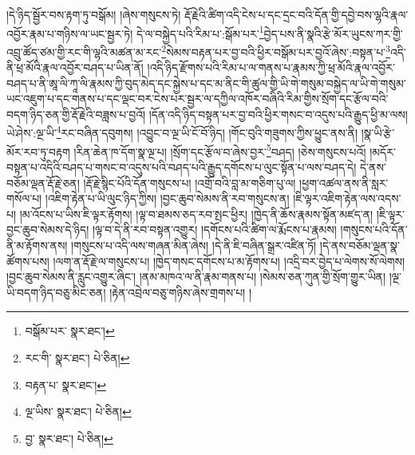 །དེ་ཉིད་སྦྱོར་བས་རྟག་ཏུ་བསྒོམ། །ཞེས་གསུངས་ཏེ། རྡོ་རྗེའི་ཚིག་འདི་ངེས་པ་དང་དྲང་བའི་དོན་གྱི་དབྱེ་བས་ལྷའི་རྣལ་འབྱོར་རྣམ་པ་གཉིས་ལ་ཡང་སྦྱར་ཏེ། དེ་ལ་བསྐྱེད་པའི་རིམ་པ་:སྒོམ་པར་\footnote{བསྒོམ་པར་  སྣར་ཐང་། }བྱེད་པས་ནི་སྣའི་རྩེ་མོར་ཡུངས་ཀར་གྱི་འབྲུ་ཚོད་ཙམ་གྱི་རང་གི་ལྷའི་མཚན་མ་རང་\footnote{རང་གི་  སྣར་ཐང་།  པེ་ཅིན། }སེམས་བརྟན་པར་བྱ་བའི་ཕྱིར་བསྒོམ་པར་བྱའོ་ཞེས་:བསྟན་པ་\footnote{བརྟན་པ་  སྣར་ཐང་། }འདི་ནི་ཕྲ་མོའི་རྣལ་འབྱོར་བཤད་པ་ཡིན་ནོ། །འདི་ཉིད་རྫོགས་པའི་རིམ་པ་ལ་གནས་པ་རྣམས་ཀྱི་ཕྲ་མོའི་རྣལ་འབྱོར་བཤད་པ་ནི་ཨཱ་ལི་ཀཱ་ལི་རྣམས་ཀྱི་བུད་མེད་དང་སྐྱེས་པ་དང་མ་ནིང་གི་ཚུལ་གྱི་ཡི་གེ་གསུམ་བསྐྱེད་ལ་ཡི་གེ་གསུམ་ཡང་འཇུག་པ་དང་གནས་པ་དང་ལྡང་བར་ངེས་པར་སྦྱར་ལ་དཀྱིལ་འཁོར་བཞིའི་རིམ་གྱིས་སྲོག་དང་རྩོལ་བའི་བདག་ཉིད་ཅན་གྱི་རྡོ་རྗེའི་བཟླས་པ་བྱའོ། །དོན་འདི་ཉིད་བསྟན་པར་བྱ་བའི་ཕྱིར་གསང་བ་འདུས་པའི་རྒྱུད་ཕྱི་མ་ལས། ཡེ་ཤེས་:ལྔ་ཡི་\footnote{ལྔ་ཡིས་  སྣར་ཐང་།  པེ་ཅིན། }རང་བཞིན་དབུགས། །འབྱུང་བ་ལྔ་ཡི་ངོ་བོ་ཉིད། །གོང་བུའི་གཟུགས་ཀྱིས་ཕྱུང་ནས་ནི། །སྣ་ཡི་རྩེ་མོར་རབ་ཏུ་བརྟག །རིན་ཆེན་ཁ་དོག་སྣ་ལྔ་པ། །སྲོག་དང་རྩོལ་བ་ཞེས་བྱར་\footnote{བྱ་  སྣར་ཐང་།  པེ་ཅིན། }བཤད། །ཅེས་གསུངས་པའོ། །མདོར་བསྟན་པ་འདིའི་བཤད་པ་གསང་བ་འདུས་པའི་བཤད་པའི་རྒྱུད་དགོངས་པ་ལུང་སྟོན་པ་ལས་བཤད་དེ། དེ་ནས་བཅོམ་ལྡན་རྡོ་རྗེ་ཅན། །རྡོ་རྗེ་སྙིང་པོའི་དོན་གསུངས་པ། །འགྲོ་བའི་བླ་མ་གཅིག་པུ་ལ། །ཕྱག་འཚལ་ནས་ནི་སླར་གསོལ་པ། །འཇིག་རྟེན་པ་ཡི་ལུང་ཉིད་ཀྱིས། །བྱང་ཆུབ་སེམས་ནི་རབ་གསུངས་ན། །ཇི་ལྟར་འཇིག་རྟེན་ལས་འདས་པ། །མ་འོངས་པ་ཡིས་ཇི་ལྟར་རྟོགས། །ལྟ་བ་ཐམས་ཅད་རབ་སྤང་ཕྱིར། །ཁྱེད་ནི་ཆོས་རྣམས་སྟོན་མཛད་ན། །ཇི་ལྟར་བྱང་ཆུབ་སེམས་དེ་ཉིད། །ལྟ་བ་དེ་ནི་རབ་བསྟན་འགྱུར། །དགོངས་པའི་ཚིག་ལ་རྨོངས་པ་རྣམས། །གསུངས་པའི་དོན་ནི་མ་རྟོགས་ནས། །གསུངས་པ་འདི་ལས་གཞན་མིན་ཞེས། །དེ་ནི་ཇི་བཞིན་སྒྲར་འཛིན་ཏོ། །དེ་ནས་བཅོམ་ལྡན་སྣ་ཚོགས་པས། །ལག་ན་རྡོ་རྗེ་ལ་གསུངས་པ། །ཁྱེད་གསང་དགོངས་པ་མ་རྟོགས་པ། །འདྲི་བར་བྱེད་པ་ལེགས་སོ་ལེགས། །བྱང་ཆུབ་སེམས་ནི་རླུང་འགྱུར་ཞིང་། །ནམ་མཁའ་ལ་ནི་རྣམ་གནས་པ། །སེམས་ཅན་ཀུན་གྱི་སྲོག་གྱུར་ཡིན། །ལྔ་ཡི་བདག་ཉིད་བཅུ་མིང་ཅན། །རྟེན་འབྲེལ་བཅུ་གཉིས་ཞེས་གྲགས་པ། །
